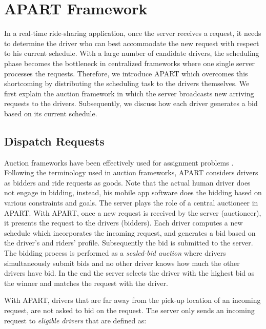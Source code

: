 \vspace{-4mm}
\section{APART Framework}
\vspace{-1mm}
\label{sec:framework}

In a real-time ride-sharing application, once the server receives a request, it needs to determine the driver who can best accommodate the new request with respect to his current schedule. With a large number of candidate drivers, the scheduling phase becomes the bottleneck in centralized frameworks where one single server processes the requests. Therefore, we introduce APART which overcomes this shortcoming by distributing the scheduling task to the drivers themselves. We first explain the auction framework in which the server broadcasts new arriving requests to the drivers. Subsequently, we discuss how each driver generates a bid based on its current schedule.

\subsection{Dispatch Requests}
\label{subsec:dispatch}
Auction frameworks have been effectively used for assignment problems \cite{Lagoudakis04,Mehta05}. Following the terminology used in auction frameworks, APART considers drivers as bidders and ride requests as goods. Note that the actual human driver does not engage in bidding, instead, his mobile app software does the bidding based on various constraints and goals. The server plays the role of a central auctioneer in APART. With APART, once a new request is received by the server (auctioneer), it presents the request to the drivers (bidders). Each driver computes a new schedule which incorporates the incoming request, and generates a bid based on the driver's and riders' profile. Subsequently the bid is submitted to the server. The bidding process is performed as a \textit{sealed-bid auction} where drivers simultaneously submit bids and no other driver knows how much the other drivers have bid. In the end the server selects the driver with the highest bid as the winner and matches the request with the driver.

With APART, drivers that are far away from the pick-up location of an incoming request, are not asked to bid on the request. The server only sends an incoming request to \textit{eligible drivers} that are defined as:

